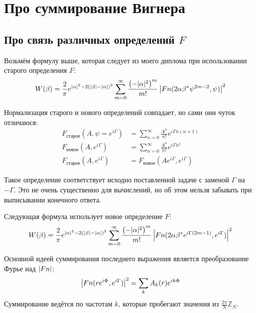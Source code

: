 \documentclass[a4paper, 12pt]{article}
\newenvironment{eqw}{\begin{equation} \begin{aligned}}   
    {\end{aligned}    \end{equation}}
\begin{document}
\section{Про суммирование Вигнера}
\subsection*{Про связь различных определений $F$}
Возьмём формулу выше, которая следует из моего диплома при использовании старого определения $F$:
\begin{equation}\label{QtoW}
	\begin{aligned}
		W(\beta) = \frac{2}{\pi}e^{\abs{\alpha}^2-2\left(\abs{\beta} - \abs{\alpha}\right)^2}\sum\limits_{m=0}^{\infty} \frac{\left(-|\alpha|^2\right)^m}{m!}\left|Fn(2\alpha \beta^*\psi^{2m-2}, \psi)\right|^2
	\end{aligned}
\end{equation}

Нормализация старого и нового определений совпадает, но сами они чуток отличаюся:
\begin{eqw}
     F_{\text{старое}}(A, \psi = e^{i\Gamma}) &= \sum\limits_{n=0}^{\infty} \frac{A^n}{n!}e^{i\Gamma n(n+1)}\\
     F_{\text{новое}}(A, e^{i\Gamma}) &= \sum\limits_{n=0}^{\infty} \frac{A^n}{n!}e^{i\Gamma n^2}\\
     F_{\text{старое}}(A, e^{i\Gamma}) &= F_{\text{новое}}(Ae^{i\Gamma}, e^{i\Gamma})
\end{eqw}

Такое определение соответствует исходно поставленной задаче с заменой $\Gamma$ на $-\Gamma$. Это не очень существенно для вычислений, но об этом нельзя забывать при выписывании конечного ответа.

Следующая формула использует новое определение $F$:
\begin{eqw}
    W(\beta) = \frac{2}{\pi}e^{\abs{\alpha}^2-2\left(\abs{\beta} - \abs{\alpha}\right)^2}\sum\limits_{m=0}^{\infty} \frac{\left(-|\alpha|^2\right)^m}{m!}\left|Fn(2\alpha \beta^*e^{i\Gamma(2m-1)}, e^{i\Gamma})\right|^2
\end{eqw}

Основной идеей суммирования последнего выражения является преобразование Фурье над $\abs{Fn}$:
\begin{eqw}
    \abs{Fn(re^{i\Phi}, e^{i\Gamma})}^2 = \sum\limits_k A_k(r)e^{ik\Phi}
\end{eqw}
Суммирование ведётся по частотам $k$, которые пробегают значения из $\frac{2\pi}{N}\mathbb{Z}_N$.
\end{document}
